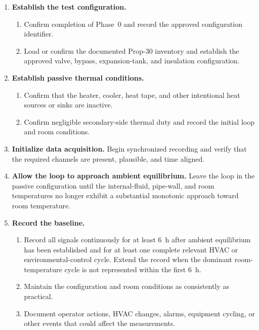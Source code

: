 \documentclass[11pt]{article}
\begin{document}
\begin{enumerate}
    \item \textbf{Establish the test configuration.}
    \begin{enumerate}
        \item Confirm completion of Phase~0 and record the approved configuration identifier.
        \item Load or confirm the documented Prop-30 inventory and establish the approved valve, bypass, expansion-tank, and insulation configuration.
    \end{enumerate}

    \item \textbf{Establish passive thermal conditions.}
    \begin{enumerate}
        \item Confirm that the heater, cooler, heat tape, and other intentional heat sources or sinks are inactive.
        \item Confirm negligible secondary-side thermal duty and record the initial loop and room conditions.
    \end{enumerate}

    \item \textbf{Initialize data acquisition.}
    Begin synchronized recording and verify that the required channels are present, plausible, and time aligned.

    \item \textbf{Allow the loop to approach ambient equilibrium.}
    Leave the loop in the passive configuration until the internal-fluid, pipe-wall, and room temperatures no longer exhibit a substantial monotonic approach toward room temperature.

    \item \textbf{Record the baseline.}
    \begin{enumerate}
        \item Record all signals continuously for at least \SI{6}{h} after ambient equilibrium has been established and for at least one complete relevant HVAC or environmental-control cycle. Extend the record when the dominant room-temperature cycle is not represented within the first \SI{6}{h}.
        \item Maintain the configuration and room conditions as consistently as practical.
        \item Document operator actions, HVAC changes, alarms, equipment cycling, or other events that could affect the measurements.
    \end{enumerate}
\end{enumerate}
\end{document}
